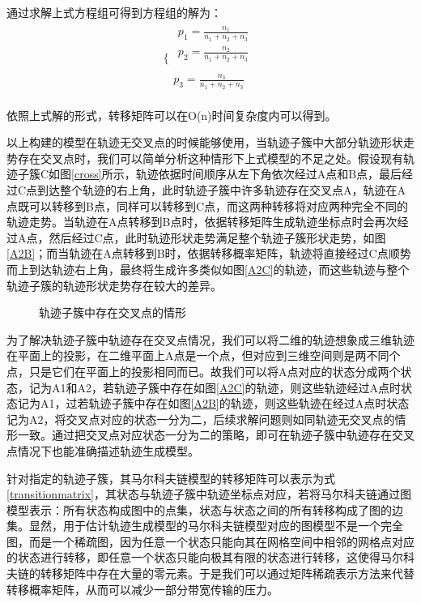 通过求解上式方程组可得到方程组的解为：
\[
\{ \begin{array}{c}
	\begin{array}{c}
	p_1=\frac{n_1}{n_1+n_2+n_3}\\
	p_2=\frac{n_2}{n_1+n_2+n_3}\\
\end{array}\\
	p_3=\frac{n_3}{n_1+n_2+n_3}\\
\end{array} 
\]

依照上式解的形式，转移矩阵可以在O(n)时间复杂度内可以得到。

以上构建的模型在轨迹无交叉点的时候能够使用，当轨迹子簇中大部分轨迹形状走势存在交叉点时，我们可以简单分析这种情形下上式模型的不足之处。假设现有轨迹子簇C如图\ref{cross}所示，轨迹依据时间顺序从左下角依次经过A点和B点，最后经过C点到达整个轨迹的右上角，此时轨迹子簇中许多轨迹存在交叉点A，轨迹在A点既可以转移到B点，同样可以转移到C点，而这两种转移将对应两种完全不同的轨迹走势。当轨迹在A点转移到B点时，依据转移矩阵生成轨迹坐标点时会再次经过A点，然后经过C点，此时轨迹形状走势满足整个轨迹子簇形状走势，如图\ref{A2B}；而当轨迹在A点转移到B时，依据转移概率矩阵，轨迹将直接经过C点顺势而上到达轨迹右上角，最终将生成许多类似如图\ref{A2C}的轨迹，而这些轨迹与整个轨迹子簇的轨迹形状走势存在较大的差异。
\begin{figure}[h]
\caption{轨迹子簇中存在交叉点的情形}
\label{crosssituation}
\end{figure}

为了解决轨迹子簇中轨迹存在交叉点情况，我们可以将二维的轨迹想象成三维轨迹在平面上的投影，在二维平面上A点是一个点，但对应到三维空间则是两不同个点，只是它们在平面上的投影相同而已。故我们可以将A点对应的状态分成两个状态，记为A1和A2，若轨迹子簇中存在如图\ref{A2C}的轨迹，则这些轨迹经过A点时状态记为A1，过若轨迹子簇中存在如图\ref{A2B}的轨迹，则这些轨迹在经过A点时状态记为A2，将交叉点对应的状态一分为二，后续求解问题则如同轨迹无交叉点的情形一致。通过把交叉点对应状态一分为二的策略，即可在轨迹子簇中轨迹存在交叉点情况下也能准确描述轨迹生成模型。

针对指定的轨迹子簇，其马尔科夫链模型的转移矩阵可以表示为式\ref{transitionmatrix}，其状态与轨迹子簇中轨迹坐标点对应，若将马尔科夫链通过图模型表示：所有状态构成图中的点集，状态与状态之间的所有转移构成了图的边集。显然，用于估计轨迹生成模型的马尔科夫链模型对应的图模型不是一个完全图，而是一个稀疏图，因为任意一个状态只能向其在网格空间中相邻的网格点对应的状态进行转移，即任意一个状态只能向极其有限的状态进行转移，这使得马尔科夫链的转移矩阵中存在大量的零元素。于是我们可以通过矩阵稀疏表示方法来代替转移概率矩阵，从而可以减少一部分带宽传输的压力。\\

